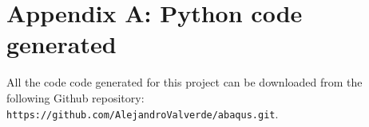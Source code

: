 \appendix
\section*{Appendix A: Python code generated} \label{appen:code}

All the code code generated for this project can be downloaded from the following Github repository: \texttt{https://github.com/AlejandroValverde/abaqus.git}.